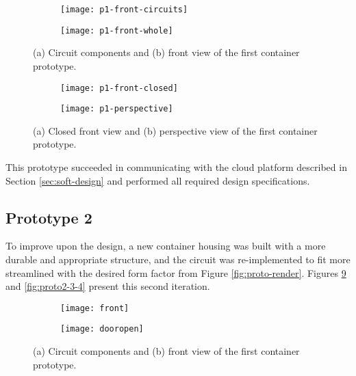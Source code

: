 \begin{figure}[h]
\centering
\begin{subfigure}{.5\textwidth}
  \centering
\texttt{[image: p1-front-circuits]}
\label{fig:proto1-1}
\end{subfigure}%
\begin{subfigure}{.5\textwidth}
  \centering
\texttt{[image: p1-front-whole]}
\label{fig:proto1-2}
\end{subfigure}
\caption{(a) Circuit components and (b) front view of the first container prototype.}
\label{fig:proto1-1-2}
\end{figure}

\begin{figure}[h]
\centering
\begin{subfigure}{.5\textwidth}
  \centering
\texttt{[image: p1-front-closed]}
\label{fig:proto1-3}
\end{subfigure}%
\begin{subfigure}{.5\textwidth}
  \centering
\texttt{[image: p1-perspective]}
\label{fig:proto1-4}
\end{subfigure}
\caption{(a) Closed front view and (b) perspective view of the first container prototype.}
\label{fig:proto1-3-4}
\end{figure}

This prototype succeeded in communicating with the cloud platform described in Section \ref{sec:soft-design} and performed all required design specifications.

\subsection{Prototype 2}

To improve upon the design, a new container housing was built with a more durable and appropriate structure, and the circuit was re-implemented to fit more streamlined with the desired form factor from Figure \ref{fig:proto-render}. Figures \ref{fig:proto2-1-2} and \ref{fig:proto2-3-4} present this second iteration.

\begin{figure}[h]
\centering
\begin{subfigure}{.5\textwidth}
  \centering
\texttt{[image: front]}
\label{fig:proto2-1}
\end{subfigure}%
\begin{subfigure}{.5\textwidth}
  \centering
\texttt{[image: dooropen]}
\label{fig:proto2-2}
\end{subfigure}
\caption{(a) Circuit components and (b) front view of the first container prototype.}
\label{fig:proto2-1-2}
\end{figure}

